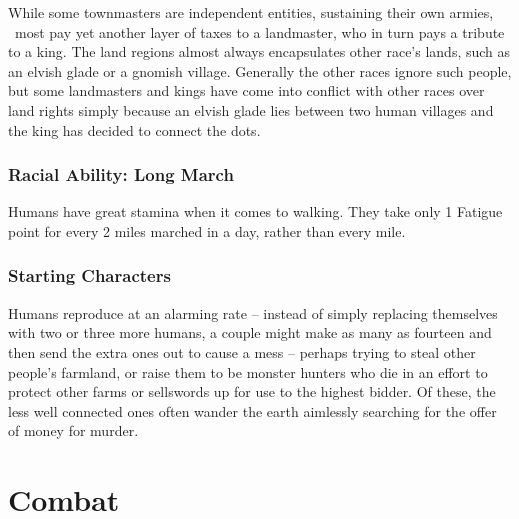 \documentclass[titlepage,a4paper,openany]{book}
\begin{document}
\begin{multicols}{2}
While some townmasters are independent entities, sustaining their own armies, \ most pay yet another layer of taxes to a landmaster, who in turn pays a tribute to a king. The land regions almost always encapsulates other race's lands, such as an elvish glade or a gnomish village. Generally the other races ignore such people, but some landmasters and kings have come into conflict with other races over land rights simply because an elvish glade lies between two human villages and the king has decided to connect the dots.

\subsection{Racial Ability: Long March}

Humans have great stamina when it comes to walking. They take only 1 Fatigue point for every 2 miles marched in a day, rather than every mile.

\subsection{Starting Characters}

Humans reproduce at an alarming rate -- instead of simply replacing themselves with two or three more humans, a couple might make as many as fourteen and then send the extra ones out to cause a mess -- perhaps trying to steal other people's farmland, or raise them to be monster hunters who die in an effort to protect other farms or sellswords up for use to the highest bidder.
Of these, the less well connected ones often wander the earth aimlessly searching for the offer of money for murder.

\end{multicols}

\chapter{Combat}
\end{document}

